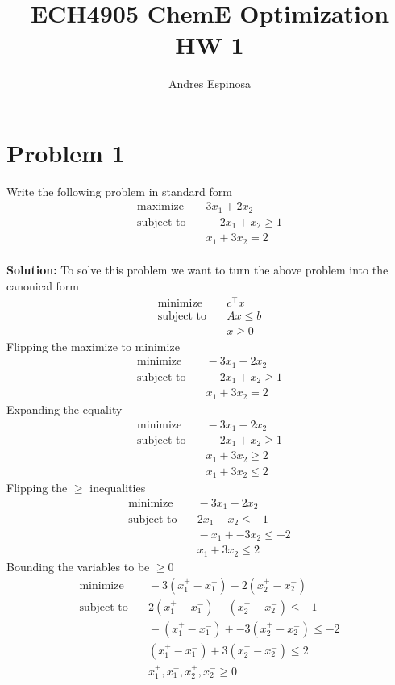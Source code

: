 \documentclass[11pt]{article}
\title{ECH4905 ChemE Optimization HW 1}
\author{Andres Espinosa}
\begin{document}
\maketitle

\section{Problem 1}
Write the following problem in standard form
\begin{align}
  \text{maximize} & \quad 3 x_1 + 2x_2 \\
  \text{subject to} & \quad -2x_1 + x_2 \geq 1 \\
  & \quad x_1 + 3x_2 = 2
\end{align}
\\
\textbf{Solution: }
To solve this problem we want to turn the above problem into the canonical form
\begin{align}
  \text{minimize} & \quad c^\top x \\
  \text{subject to} & \quad Ax \leq b \\
  & \quad x \geq 0
\end{align}
Flipping the maximize to minimize
\begin{align}
  \text{minimize} & \quad -3 x_1 - 2x_2 \\
  \text{subject to} & \quad -2x_1 + x_2 \geq 1 \\
  & \quad x_1 + 3x_2 = 2
\end{align}
Expanding the equality
\begin{align}
  \text{minimize} & \quad -3 x_1 - 2x_2 \\
  \text{subject to} & \quad -2x_1 + x_2 \geq 1 \\
  & \quad x_1 + 3x_2 \geq 2 \\
  & \quad x_1 + 3x_2 \leq 2
\end{align}
Flipping the $\geq$ inequalities
\begin{align}
  \text{minimize} & \quad -3 x_1 - 2x_2 \\
  \text{subject to} & \quad 2x_1 - x_2 \leq -1 \\
  & \quad -x_1 + -3x_2 \leq -2 \\
  & \quad x_1 + 3x_2 \leq 2
\end{align}
Bounding the variables to be $\geq 0$
\begin{align}
  \text{minimize} & \quad -3 (x_1^+ - x_1^-) - 2(x_2^+ - x_2^-) \\
  \text{subject to} & \quad 2(x_1^+ - x_1^-) - (x_2^+ - x_2^-) \leq -1 \\
  & \quad -(x_1^+ - x_1^-) + -3(x_2^+ - x_2^-) \leq -2 \\
  & \quad (x_1^+ - x_1^-) + 3(x_2^+ - x_2^-) \leq 2 \\
  & \quad x_1^+, x_1^-, x_2^+, x_2^- \geq 0
\end{align}
\end{document}
